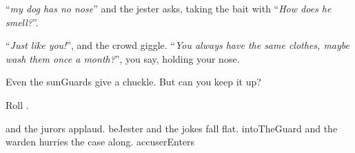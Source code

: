 ``\textit{my dog has no nose}'' and the jester asks, taking the bait with
``\textit{How does he smell?}''.

``\textit{Just like you!}'', and the crowd giggle.
``\textit{You always have the same clothes, maybe wash them once a month?}'', you say, holding your nose.

Even the \glspl{sunGuard} give a chuckle.
But can you keep it up?

Roll .

\begin{selectPath}
  {and the jurors applaud.}%
  {beJester}
  {and the jokes fall flat.}%
  {intoTheGuard}
  {and the \gls{warden} hurries the case along.}%
  {accuserEnters}
\end{selectPath}


